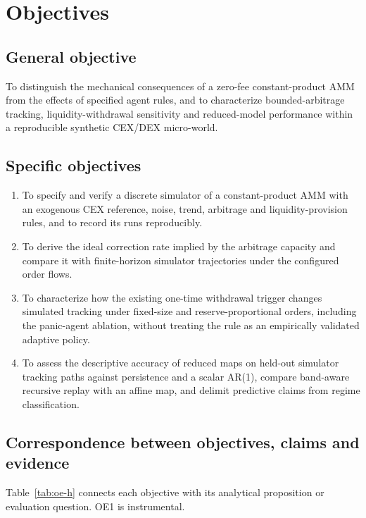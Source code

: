 \chapter{Objectives}
\label{cap:objetivos}

\section{General objective}

To distinguish the mechanical consequences of a zero-fee constant-product AMM from the effects of specified agent rules, and to characterize bounded-arbitrage tracking, liquidity-withdrawal sensitivity and reduced-model performance within a reproducible synthetic CEX/DEX micro-world.

\section{Specific objectives}

\begin{enumerate}[label=\textbf{OE\arabic*.}, leftmargin=3em]
  \item To specify and verify a discrete simulator of a constant-product AMM with an exogenous CEX reference, noise, trend, arbitrage and liquidity-provision rules, and to record its runs reproducibly.
  \item To derive the ideal correction rate implied by the arbitrage capacity and compare it with finite-horizon simulator trajectories under the configured order flows.
  \item To characterize how the existing one-time withdrawal trigger changes simulated tracking under fixed-size and reserve-proportional orders, including the panic-agent ablation, without treating the rule as an empirically validated adaptive policy.
  \item To assess the descriptive accuracy of reduced maps on held-out simulator tracking paths against persistence and a scalar AR(1), compare band-aware recursive replay with an affine map, and delimit predictive claims from regime classification.
\end{enumerate}

\section{Correspondence between objectives, claims and evidence}

Table~\ref{tab:oe-h} connects each objective with its analytical proposition or evaluation question. OE1 is instrumental.

